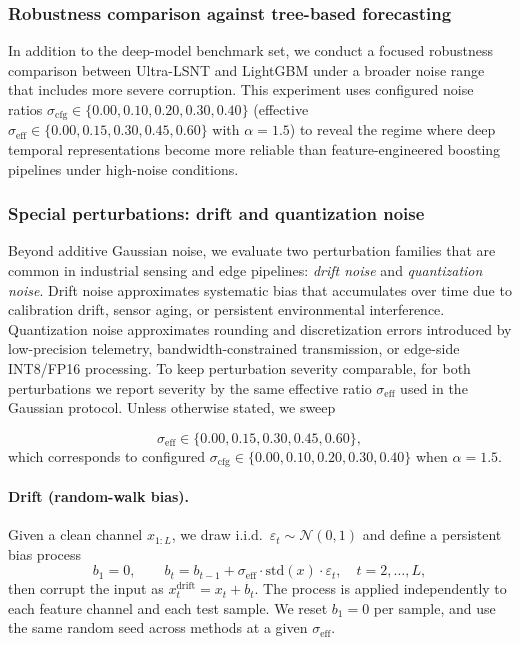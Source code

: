 \documentclass[review,3p,times]{elsarticle}
\begin{document}
\subsubsection{Robustness comparison against tree-based forecasting}
In addition to the deep-model benchmark set, we conduct a focused robustness comparison between Ultra-LSNT and LightGBM under a broader noise range that includes more severe corruption. This experiment uses configured noise ratios $\sigma_{\mathrm{cfg}}\in\{0.00,0.10,0.20,0.30,0.40\}$ (effective $\sigma_{\mathrm{eff}}\in\{0.00,0.15,0.30,0.45,0.60\}$ with $\alpha=1.5$) to reveal the regime where deep temporal representations become more reliable than feature-engineered boosting pipelines under high-noise conditions.

\subsubsection{Special perturbations: drift and quantization noise}
Beyond additive Gaussian noise, we evaluate two perturbation families that are common in industrial sensing and edge pipelines: \emph{drift noise} and \emph{quantization noise}. Drift noise approximates systematic bias that accumulates over time due to calibration drift, sensor aging, or persistent environmental interference. Quantization noise approximates rounding and discretization errors introduced by low-precision telemetry, bandwidth-constrained transmission, or edge-side INT8/FP16 processing. To keep perturbation severity comparable, for both perturbations we report severity by the same effective ratio $\sigma_{\mathrm{eff}}$ used in the Gaussian protocol. Unless otherwise stated, we sweep

\begin{equation}
\sigma_{\mathrm{eff}} \in \{0.00, 0.15, 0.30, 0.45, 0.60\},
\end{equation}
which corresponds to configured $\sigma_{\mathrm{cfg}}\in\{0.00,0.10,0.20,0.30,0.40\}$ when $\alpha=1.5$.

\paragraph{Drift (random-walk bias).}
Given a clean channel $x_{1:L}$, we draw i.i.d.\ $\varepsilon_t\sim\mathcal{N}(0,1)$ and define a persistent bias process
\begin{equation}
b_1 = 0,\qquad b_t = b_{t-1} + \sigma_{\mathrm{eff}}\cdot \mathrm{std}(x)\cdot \varepsilon_t,\quad t=2,\dots,L,
\end{equation}
then corrupt the input as $x^{\text{drift}}_t = x_t + b_t$. The process is applied independently to each feature channel and each test sample. We reset $b_1=0$ per sample, and use the same random seed across methods at a given $\sigma_{\mathrm{eff}}$.
\end{document}
